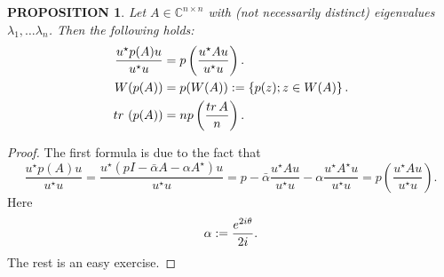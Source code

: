 \documentclass[10pt,a4paper,reqno]{amsart}
\newtheorem{prop}[defi]{\bf P\scriptsize ROPOSITION \normalsize}
\newenvironment{proposition}{\begin{prop}\it}{\end{prop}}
\newcommand{\zav}[1]{\left( #1 \right)}
\newcommand{\szav}[1]{\left\{ #1 \right\}}
\newcommand{\imag}{{\rm i}}
\newcommand{\tr}{{\rm tr}\,}
\begin{document}
\begin{proposition}
Let $A\in\mathbb{C}^{n\times n}$ with (not necessarily distinct) eigenvalues $\lambda_1,\dots \lambda_n$. Then the following holds:
\begin{align}
\frac{u^\star p(A) u}{u^\star u}&=p\zav{\frac{u^\star A u}{u^\star u}}.\\
W(p(A))&=p(W(A)):=\szav{p(z); z\in W(A)}.\\
\tr \zav{p(A)}&=n p\zav{\frac{\tr A}{n}}.
\end{align}
\end{proposition}
\begin{proof}
The first formula is due to the fact that 
$$
\frac{u^\star p(A) u}{u^\star u}=\frac{u^\star \zav{pI-\bar\alpha A-\alpha A^\star} u}{u^\star u}=p-\bar\alpha \frac{u^\star A u}{u^\star u}-\alpha \frac{u^\star A^\star u}{u^\star u}=p\zav{\frac{u^\star A u}{u^\star u}}.
$$
Here
$$
\alpha:=\frac{e^{2\imag \theta}}{2\imag}.
$$
The rest is an easy exercise.
\end{proof}
\end{document}
